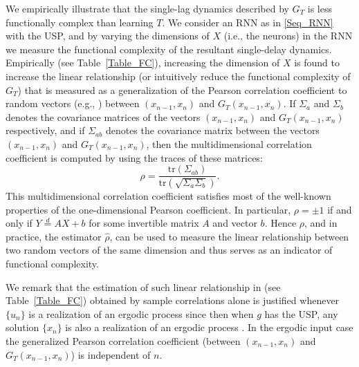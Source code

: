 \documentclass[12 pt]{article}
\begin{document}
We empirically illustrate that the single-lag dynamics described by $G_T$ is less functionally complex than learning $T$. We consider an RNN as in \eqref{Seq_RNN} with the USP, and by varying the dimensions of $X$ (i.e., the neurons) in the RNN we measure the functional complexity of the resultant single-delay dynamics. 
Empirically (see Table~\ref{Table_FC}), increasing the dimension of $X$ is found to increase the linear relationship (or intuitively reduce the functional complexity of $G_T$) that is measured as a generalization of the Pearson correlation coefficient to random vectors (e.g., \cite{puccetti2019measuring}) between 
$(x_{n-1},x_n)$ and $G_T(x_{n-1},x_n)$. 
If $\Sigma_{a}$ and $\Sigma_{b}$ denotes the covariance matrices of the vectors $(x_{n-1},x_n)$ and $G_T(x_{n-1},x_n)$ respectively, and if $\Sigma_{ab}$ denotes the covariance matrix between the vectors $(x_{n-1},x_n)$ and $G_T(x_{n-1},x_n)$, then the multidimensional correlation coefficient is computed by using the traces of these matrices:
$$
    \rho= \frac{\text{tr}({\Sigma_{ab}})}{\text{tr}({\sqrt{\Sigma_a\Sigma_b}})}.
$$
This multidimensional correlation coefficient satisfies most of the well-known properties of the one-dimensional Pearson coefficient. In particular, $\rho=\pm 1$ if and only if $Y\overset{d}{=}AX+b$ for some invertible matrix $A$ and vector $b$. Hence $\rho$, and in practice, the estimator $\hat{\rho}$, can be used 
to measure the linear relationship between two random vectors of the same dimension and thus serves as an indicator of functional complexity. 




We remark that the estimation of such linear relationship in (see Table~\ref{Table_FC}) obtained by sample correlations alone is justified whenever $\{u_n\}$ is a realization of an ergodic process since then when $g$ has the USP, any solution $\{x_n\}$ is also a realization of an ergodic process \cite{manjunath2014dynamics}. In the ergodic input case the generalized Pearson correlation coefficient  (between $(x_{n-1},x_n)$ and $G_T(x_{n-1},x_n)$) is independent of $n$. 
\end{document}

